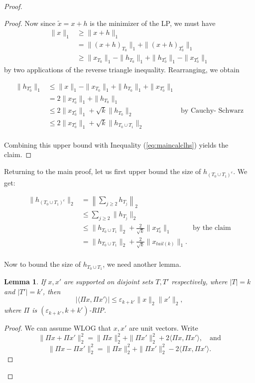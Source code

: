 \documentclass[11pt]{article}
\newcommand{\eps}{\varepsilon}
\newtheorem{lemma}[theorem]{Lemma}
\begin{document}
\begin{proof}
\begin{proof}
Now since $\tilde{x} = x + h$ is the minimizer of the LP, we must 
have
\begin{align*}
	\|x\|_1 &\ge \|x + h\|_1 \\
	&= \|(x + h)_{T_0}\|_1 + \|(x + h)_{T_0^c}\|_1 \\
	&\ge \|x_{T_0}\|_1 - \|h_{T_0}\|_1 + \|h_{T_0^c}\|_1 - \|
	x_{T_0^c}\|_1
\end{align*}
by two applications of the reverse triangle inequality. Rearranging, 
we obtain

\begin{align*}
	\|h_{T_0^c}\|_1 &\le \|x\|_1 - \|x_{T_0}\|_1 + \|h_{T_0}\|_1 + \|
	x_{T_0^c}\|_1 \\
	&= 2\|x_{T_0^c}\|_1 + \|h_{T_0}\|_1 \\
	&\le 2\|x_{T_0^c}\|_1 + \sqrt{k}\|h_{T_0}\|_2 & \text{by Cauchy-
	Schwarz}\\
	&\le 2\|x_{T_0^c}\|_1 + \sqrt{k}\|h_{T_0 \cup T_1}\|_2\\
\end{align*}

Combining this upper bound with Inequality (\ref{eq:maincalclhs}) 
yields the claim.

\end{proof}

Returning to the main proof, let us first upper bound the size 
of $h_{(T_0 \cup T_1)^c}$. We get:

\begin{align*}
	\|h_{(T_0 \cup T_1)^c}\|_2 &= \left\|\sum_{j \ge 2} h_{T_j}\right
	\|_2 \\
	& \le \sum_{j\ge 2} \| h_{T_j}\|_2 \\
	& \le \|h_{T_0 \cup T_1}\|_2 + \frac{2}{\sqrt{k}} \|x_{T_0^c}\|_1 
	& \text{by the claim} \\
	&= \|h_{T_0 \cup T_1}\|_2 + \frac{2}{\sqrt{k}} \|x_{tail(k)}\|_1. 
	\\
\end{align*}

Now to bound the size of $h_{T_0 \cup T_1}$, we need another lemma.

\begin{lemma} \label{lem:ipbound}
	If $x, x'$ are supported on disjoint sets $T, T'$ respectively, 
	where 
	$|T| = k$ and $|T'| = k'$, then
	\[|\langle \Pi x, \Pi x' \rangle | \le \eps_{k+k'} \|x\|_2 \|x'\|
	_2,\]
	where $\Pi$ is $(\eps_{k + k'}, k+k')$-RIP.
\end{lemma}

\begin{proof}
	We can assume WLOG that $x, x'$ are unit vectors. Write
	\[\|\Pi x + \Pi x'\|_2^2 = \|\Pi x\|_2^2 + \|\Pi x'\|_2^2 + 
	2\langle \Pi x, \Pi x' \rangle,\quad \text{and}\]
	\[\|\Pi x - \Pi x'\|_2^2 = \|\Pi x\|_2^2 + \|\Pi x'\|_2^2 - 
	2\langle \Pi x, \Pi x' \rangle.\]


\end{proof}
\end{proof}
\end{document}
